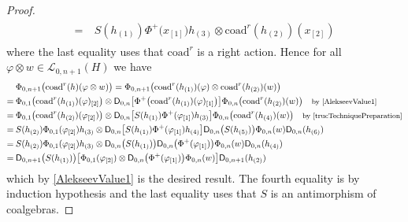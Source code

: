 \documentclass[11pt]{amsart}
\begin{document}
\begin{proof}
\begin{align}
\begin{split}
=\:&S(h_{(1)})\Phi^+\bigl( x_{[1]} \bigr) h_{(3)} \otimes \mathrm{coad}^r(h_{(2)})(x_{[2]})
\end{split}
\end{align}
where the last equality uses that $\mathrm{coad}^r$ is a right action. Hence for all $\varphi \otimes w \in \mathcal{L}_{0,n+1}(H)$ we have
\begin{align*}
&\Phi_{0,n+1}\bigl( \mathrm{coad}^r(h)(\varphi \otimes w) \bigr) = \Phi_{0,n+1}\bigl( \mathrm{coad}^r(h_{(1)})(\varphi) \otimes \mathrm{coad}^r(h_{(2)})(w) \bigr)\\
=\:&\Phi_{0,1}\bigl( \mathrm{coad}^r(h_{(1)})(\varphi)_{[2]} \bigr) \otimes \mathsf{D}_{0,n}\bigl[ \Phi^+\bigl(\mathrm{coad}^r(h_{(1)})(\varphi)_{[1]} \bigr) \bigr] \Phi_{0,n}\bigl( \mathrm{coad}^r(h_{(2)})(w) \bigr) \quad \text{\footnotesize by \eqref{AlekseevValue1}}\\
=\:&\Phi_{0,1}\bigl( \mathrm{coad}^r(h_{(2)})(\varphi_{[2]}) \bigr) \otimes \mathsf{D}_{0,n}\bigl[ S(h_{(1)}) \Phi^+(\varphi_{[1]}) h_{(3)} \bigr] \Phi_{0,n}\bigl( \mathrm{coad}^r(h_{(4)})(w) \bigr) \quad \text{\footnotesize by \eqref{trucTechniquePreparation}}\\
=\:&S(h_{(2)})\Phi_{0,1}(\varphi_{[2]})h_{(3)} \otimes \mathsf{D}_{0,n}\bigl[ S(h_{(1)}) \Phi^+(\varphi_{[1]}) h_{(4)} \bigr] \mathsf{D}_{0,n}\bigl( S(h_{(5)}) \bigr) \Phi_{0,n}(w) \mathsf{D}_{0,n}(h_{(6)})\\
=\:&S(h_{(2)})\Phi_{0,1}(\varphi_{[2]})h_{(3)} \otimes \mathsf{D}_{0,n}\bigl( S(h_{(1)}) \bigr) \mathsf{D}_{0,n}\bigl( \Phi^+(\varphi_{[1]}) \bigr) \Phi_{0,n}(w) \mathsf{D}_{0,n}(h_{(4)})\\
=\:&\mathsf{D}_{0,n+1}\bigl( S(h_{(1)}) \bigr) \bigl[ \Phi_{0,1}(\varphi_{[2]}) \otimes \mathsf{D}_{0,n}\bigl( \Phi^+(\varphi_{[1]}) \bigr) \Phi_{0,n}(w) \bigr] \mathsf{D}_{0,n+1}(h_{(2)})
\end{align*}
which by \eqref{AlekseevValue1} is the desired result. The fourth equality is by induction hypothesis and the last equality uses that $S$ is an antimorphism of coalgebras.


\end{proof}
\end{document}

